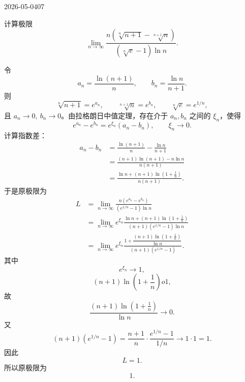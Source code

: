 \begin{mistake}{2026-05-04}{07}

\begin{problemcontent}
计算极限
\[
\lim_{n\to\infty}\frac{n\left(\sqrt[n]{n+1}-\sqrt[n+1]{n}\right)}{\left(\sqrt[n]{e}-1\right)\ln n}.
\]
\end{problemcontent}

\begin{solutioncontent}
令
\[
a_n=\frac{\ln(n+1)}{n},\qquad b_n=\frac{\ln n}{n+1}.
\]
则
\[
\sqrt[n]{n+1}=e^{a_n},\qquad \sqrt[n+1]{n}=e^{b_n},\qquad \sqrt[n]{e}=e^{1/n},
\]
且 \(a_n\to0,\ b_n\to0\)。由拉格朗日中值定理，存在介于 \(a_n,b_n\) 之间的 \(\xi_n\)，使得
\[
e^{a_n}-e^{b_n}=e^{\xi_n}(a_n-b_n),\qquad \xi_n\to0.
\]
计算指数差：
\[
\begin{aligned}
a_n-b_n
&=\frac{\ln(n+1)}{n}-\frac{\ln n}{n+1} \\
&=\frac{(n+1)\ln(n+1)-n\ln n}{n(n+1)} \\
&=\frac{\ln n+(n+1)\ln\left(1+\frac1n\right)}{n(n+1)}.
\end{aligned}
\]
于是原极限为
\[
\begin{aligned}
L
&=\lim_{n\to\infty}\frac{n\left(e^{a_n}-e^{b_n}\right)}{\left(e^{1/n}-1\right)\ln n} \\
&=\lim_{n\to\infty}e^{\xi_n}\frac{\ln n+(n+1)\ln\left(1+\frac1n\right)}{(n+1)\left(e^{1/n}-1\right)\ln n} \\
&=\lim_{n\to\infty}e^{\xi_n}\frac{1+\dfrac{(n+1)\ln\left(1+\frac1n\right)}{\ln n}}{(n+1)\left(e^{1/n}-1\right)}.
\end{aligned}
\]
其中
\[
e^{\xi_n}\to1,
\]
\[
(n+1)\ln\left(1+\frac1n\right)	o1,
\]
故
\[
\frac{(n+1)\ln\left(1+\frac1n\right)}{\ln n}\to0.
\]
又
\[
(n+1)\left(e^{1/n}-1\right)
=\frac{n+1}{n}\cdot\frac{e^{1/n}-1}{1/n}\to1\cdot1=1.
\]
因此
\[
L=1.
\]
所以原极限为
\[
\boxed{1}.
\]
\end{solutioncontent}


\end{mistake}
